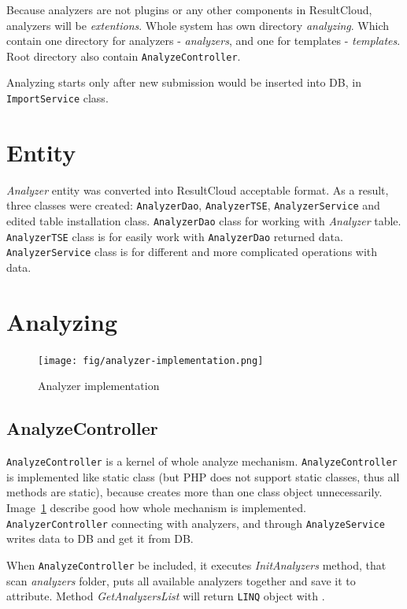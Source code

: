 Because analyzers are not plugins or any other components in ResultCloud, analyzers will be \emph{extentions}. Whole system has own directory \emph{analyzing}. Which contain one directory for analyzers - \emph{analyzers}, and one for templates - \emph{templates}. Root directory also contain \texttt{AnalyzeController}.

Analyzing starts only after new submission would be inserted into DB, in \texttt{ImportService} class.

\section{Entity}

\emph{Analyzer} entity was converted into ResultCloud acceptable format. As a result, three classes were created: \texttt{AnalyzerDao}, \texttt{AnalyzerTSE}, \texttt{AnalyzerService} and edited table installation class. \texttt{AnalyzerDao} class for working with \emph{Analyzer} table. \texttt{AnalyzerTSE} class is for easily work with \texttt{AnalyzerDao} returned data. \texttt{AnalyzerService} class is for different and more complicated operations with data.

\section{Analyzing}

\begin{figure}
  \centering
    \texttt{[image: fig/analyzer-implementation.png]}
  \caption{Analyzer implementation}
  \label{fig:an_impl}
\end{figure}

\subsection{AnalyzeController}

\texttt{AnalyzeController} is a kernel of whole analyze mechanism. \texttt{AnalyzeController} is implemented like static class (but PHP does not support static classes, thus all methods are static), because creates more than one class object unnecessarily. Image\ \ref{fig:an_impl} describe good how whole mechanism is implemented. \texttt{AnalyzerController} connecting with analyzers, and through \texttt{AnalyzeService} writes data to DB and get it from DB.

When \texttt{AnalyzeController} be included, it executes \emph{InitAnalyzers} method, that scan \emph{analyzers} folder, puts all available analyzers together and save it to \emph{} attribute. Method \emph{GetAnalyzersList} will return \texttt{LINQ} object with \emph{}.

